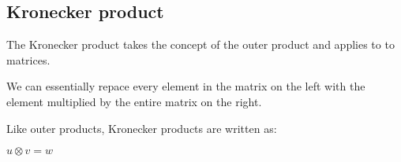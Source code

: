 
\subsection{Kronecker product}

The Kronecker product takes the concept of the outer product and applies to to matrices.

We can essentially repace every element in the matrix on the left with the element multiplied by the entire matrix on the right.

Like outer products, Kronecker products are written as:

\(u\otimes v=w\)


